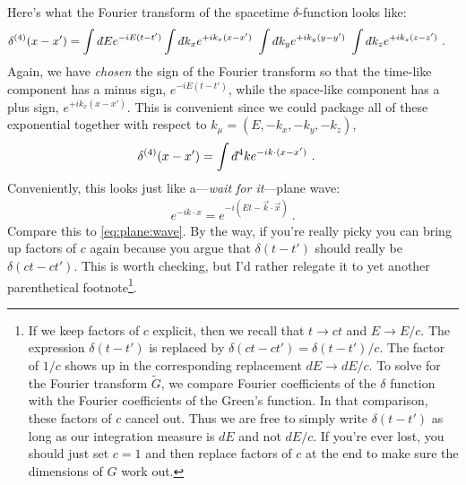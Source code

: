 \documentclass[
  11pt,
	colorful,
	raggedright,
]{tufte-style-thesis-flip}
\renewcommand{\dbar}{d\hspace*{-0.08em}\bar{}\hspace*{0.1em}}
\begin{document}
Here's what the Fourier transform of the spacetime $\delta$-function looks like:
\begin{align}
  \delta^{(4)}(x-x') &=
  \int \dbar E e^{-iE(t-t')}
  \int \dbar k_x e^{+ik_x(x-x')}\
  \int \dbar k_y e^{+ik_y(y-y')}\
  \int \dbar k_z e^{+ik_z(z-z')} \ .
\end{align}
Again, we have \emph{chosen} the sign of the Fourier transform so that the time-like component has a minus sign, $e^{-iE(t-t')}$, while the space-like component has a plus sign, $e^{+ik_x(x-x')}$. This is convenient since we could package all of these exponential together with respect to $k_\mu = (E, -k_x, -k_y, -k_z)$,
\begin{align}
  \delta^{(4)}(x-x') &=
  \int \dbar^4k e^{-ik\cdot (x-x')} \ .
  \label{eq:4D:delta:Fourier}
\end{align}
Conveniently, this looks just like a---\emph{wait for it}---plane wave:
\begin{align}
  e^{-ik\cdot x} = e^{-i\left(Et - \vec{k}\cdot\vec{x}\right)} \ .
\end{align}
Compare this to \eqref{eq:plane:wave}. By the way, if you're really picky you can bring up factors of $c$ again because you argue that $\delta(t-t')$ should really be $\delta(ct-ct')$. This is worth checking, but I'd rather relegate it to yet another parenthetical footnote\footnote{
  If we keep factors of $c$ explicit, then we recall that $t\to ct$ and $E\to E/c$. The expression $\delta(t-t')$ is replaced by $\delta(ct-ct') = \delta(t-t')/c$. The factor of $1/c$ shows up in the corresponding replacement $dE \to dE/c$. To solve for the Fourier transform $\tilde G$, we compare Fourier coefficients of the $\delta$ function with the Fourier coefficients of the Green's function. In that comparison, these factors of $c$ cancel out. Thus we are free to simply write $\delta(t-t')$ as long as our integration measure is $dE$ and not $dE/c$. If you're ever lost, you should just set $c=1$ and then replace factors of $c$ at the end to make sure the dimensions of $G$ work out.
}.
\end{document}
